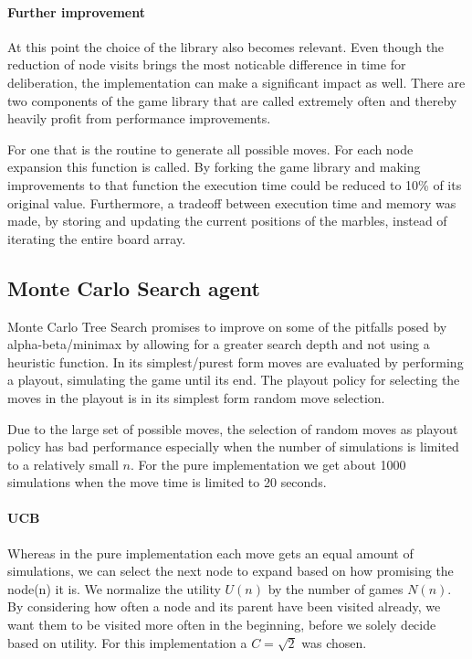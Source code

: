 \documentclass{llncs}
\begin{document}
\paragraph{Further improvement}
At this point the choice of the library also becomes relevant. Even though the reduction of node visits brings the most noticable difference in time for deliberation, the implementation can make a significant impact as well. There are two components of the game library that are called extremely often and thereby heavily profit from performance improvements.

For one that is the routine to generate all possible moves. For each node expansion this function is called. By forking the game library \cite{campfireman_campfiremanabalone-boai_2021} and making improvements to that function the execution time could be reduced to 10\% of its original value. Furthermore, a tradeoff between execution time and memory was made, by storing and updating the current positions of the marbles, instead of iterating the entire board array.

\subsection{Monte Carlo Search agent}
Monte Carlo Tree Search promises to improve on some of the pitfalls posed by alpha-beta/minimax by allowing for a greater search depth and not using a heuristic function. In its simplest/purest form moves are evaluated by performing a playout, simulating the game until its end. The playout policy for selecting the moves in the playout is in its simplest form random move selection.

Due to the large set of possible moves, the selection of random moves as playout policy has bad performance especially when the number of simulations is limited to a relatively small $n$. For the pure implementation we get about 1000 simulations when the move time is limited to 20 seconds.

\paragraph{UCB}
Whereas in the pure implementation each move gets an equal amount of simulations, we can select the next node to expand based on how promising the node(n) it is. We normalize the utility $U(n)$ by the number of games $N(n)$. By considering how often a node and its parent have been visited already, we want them to be visited more often in the beginning, before we solely decide based on utility. For this implementation a $ C = \sqrt{2}$ was chosen. \cite[p.327 ff]{russell_artificial_2021}
\end{document}

